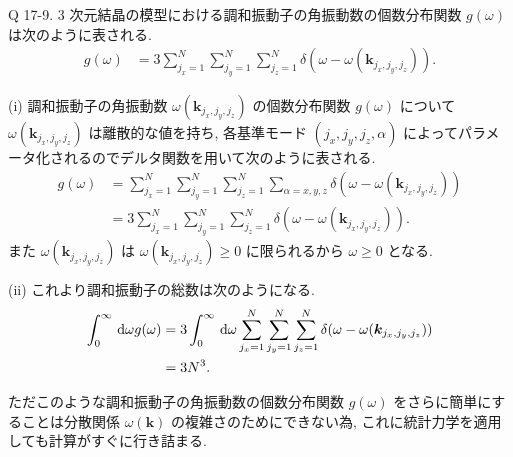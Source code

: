 \documentclass[uplatex,dvipdfmx,a4paper,11pt]{jlreq}
\numberwithin{equation}{section}
\theoremstyle{definition}
\begin{document}
\begin{itembox}[l]{Q 17-9.}
  3 次元結晶の模型における調和振動子の角振動数の個数分布関数 $g(\omega)$ は次のように表される.
  \begin{align}
    g(\omega) & = 3\sum_{j_x=1}^{N}\sum_{j_y=1}^{N}\sum_{j_z=1}^{N}\delta(\omega - \omega(\bm{k}_{j_x,j_y,j_z})).
  \end{align}
\end{itembox}

(i) 調和振動子の角振動数 $\omega(\bm{k}_{j_x, j_y, j_z})$ の個数分布関数 $g(\omega)$ について $\omega(\bm{k}_{j_x, j_y, j_z})$ は離散的な値を持ち, 各基準モード $(j_x, j_y, j_z, \alpha)$ によってパラメータ化されるのでデルタ関数を用いて次のように表される.
\begin{align}
  g(\omega) & = \sum_{j_x=1}^{N}\sum_{j_y=1}^{N}\sum_{j_z=1}^{N}\sum_{\alpha=x,y,z}\delta(\omega - \omega(\bm{k}_{j_x,j_y,j_z})) \\
            & = 3\sum_{j_x=1}^{N}\sum_{j_y=1}^{N}\sum_{j_z=1}^{N}\delta(\omega - \omega(\bm{k}_{j_x,j_y,j_z})).
\end{align}
また $\omega(\bm{k}_{j_x,j_y,j_z})$ は $\omega(\bm{k}_{j_x,j_y,j_z})\geq 0$ に限られるから $\omega\geq 0$ となる.

(ii) これより調和振動子の総数は次のようになる.
\begin{align}
  \int_0^\infty\dl{\omega}g(\omega) & = 3\int_0^\infty\dl{\omega}\sum_{j_x=1}^{N}\sum_{j_y=1}^{N}\sum_{j_z=1}^{N}\delta(\omega - \omega(\bm{k}_{j_x,j_y,j_z})) \\
                                    & = 3N^3.
\end{align}

ただこのような調和振動子の角振動数の個数分布関数 $g(\omega)$ をさらに簡単にすることは分散関係 $\omega(\bm{k})$ の複雑さのためにできない為, これに統計力学を適用しても計算がすぐに行き詰まる.
\end{document}
